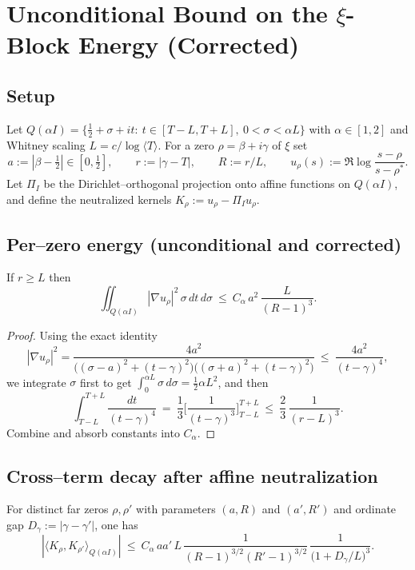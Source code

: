 
\section*{Unconditional Bound on the $\xi$-Block Energy (Corrected)}

\subsection*{Setup}
Let $Q(\alpha I)=\{\tfrac12+\sigma+it:\ t\in [T-L,T+L],\ 0<\sigma<\alpha L\}$ with $\alpha\in[1,2]$ and Whitney scaling $L=c/\log\langle T\rangle$.
For a zero $\rho=\beta+i\gamma$ of $\xi$ set
\[
 a:=|\beta-\tfrac12|\in[0,\tfrac12],\qquad r:=|\gamma-T|,\qquad R:=r/L,\qquad
 u_\rho(s):=\Re\log\frac{s-\rho}{s-\rho^\ast}.
\]
Let $\Pi_I$ be the Dirichlet–orthogonal projection onto affine functions on $Q(\alpha I)$, and define the neutralized kernels $K_\rho:=u_\rho-\Pi_I u_\rho$.

\subsection*{Per–zero energy (unconditional and corrected)}
\begin{lemma}\label{lem:single}
If $r\ge L$ then
\[
 \iint_{Q(\alpha I)} |\nabla u_\rho|^2\,\sigma\,dt\,d\sigma
 \ \le\ C_\alpha\,a^2\,\frac{L}{(R-1)^3}.
\]
\end{lemma}

\begin{proof}
Using the exact identity
\[
 |\nabla u_\rho|^2=\frac{4a^2}{\big((\sigma-a)^2+(t-\gamma)^2\big)\big((\sigma+a)^2+(t-\gamma)^2\big)}
 \ \le\ \frac{4a^2}{(t-\gamma)^4},
\]
we integrate $\sigma$ first to get $\int_0^{\alpha L}\sigma\,d\sigma=\tfrac12\alpha L^2$, and then
\[
 \int_{T-L}^{T+L}\frac{dt}{(t-\gamma)^4}
 \ =\ \frac{1}{3}\Big[\frac{1}{(t-\gamma)^3}\Big]_{T-L}^{T+L}
 \ \le\ \frac{2}{3}\,\frac{1}{(r-L)^3}.
\]
Combine and absorb constants into $C_\alpha$.
\end{proof}

\subsection*{Cross–term decay after affine neutralization}
\begin{lemma}\label{lem:offdiag}
For distinct far zeros $\rho,\rho'$ with parameters $(a,R)$ and $(a',R')$ and ordinate gap $D_\gamma:=|\gamma-\gamma'|$, one has
\[
 |\langle K_\rho,K_{\rho'}\rangle_{Q(\alpha I)}|
 \ \le\ C_\alpha\, a a'\, L\,
 \frac{1}{(R-1)^{3/2}(R'-1)^{3/2}}\,
 \frac{1}{\big(1+D_\gamma/L\big)^{3}}.
\]
\end{lemma}

